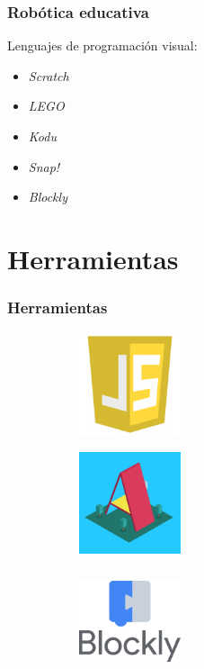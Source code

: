 \documentclass[xcolor={table}]{beamer}
\begin{document}
			\begin{frame}
			\frametitle{Robótica educativa}
			Lenguajes de programación visual:
			\begin{itemize}
				\item \textit{Scratch}
			    \item \textit{LEGO}
			    \item \textit{Kodu}
			    \item \textit{Snap!}
			    \item \textit{Blockly}
			\end{itemize}
		\end{frame}

	\section{Herramientas}
		\begin{frame}
			\frametitle{Herramientas}
\begin{figure}[H]
\centering
\begin{subfigure}{\textwidth}
    \includegraphics[width=3cm, height=3cm]{img/js.png}
\label{fig:figure2_4}
\end{subfigure}
\begin{subfigure}{\textwidth}
    \includegraphics[width=3cm, height=3cm]{img/aframe.png}
\label{fig:figure2_5}
\end{subfigure}\hfill
\begin{subfigure}{\textwidth}
    \includegraphics[width=3cm, height=3cm]{img/blockly.png}
\label{fig:figure2_6}
\end{subfigure}\hfill

\end{figure}
\end{frame}
\end{document}
